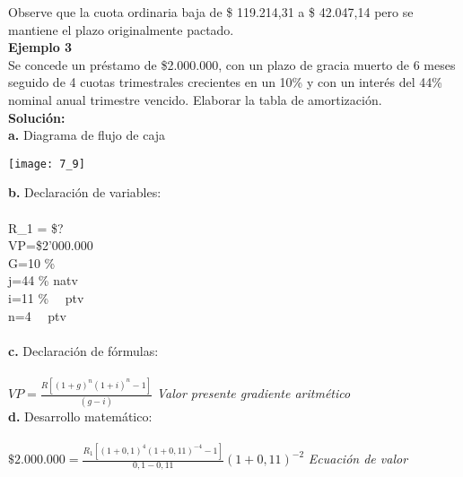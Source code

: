 Observe que la cuota ordinaria baja de \$ 119.214,31 a \$ 42.047,14 pero se mantiene el plazo originalmente pactado.\\

\textbf{Ejemplo 3 }\\
Se concede un préstamo de \$2.000.000, con un plazo de gracia muerto de 6 meses seguido de 4 cuotas trimestrales crecientes en un 10\%  y con un interés del 44\% nominal anual trimestre vencido. Elaborar la tabla de amortización.\\

\textbf{Solución:}\\
\textbf{a.} Diagrama de flujo de caja
\begin{center}
	\texttt{[image: 7\_9]}
\end{center}
\textbf{b.} Declaración de variables: \\\\

	R_{1}  = \$?\\
	VP=\$2'000.000\\
	G=10 \%  \\
	j=44 \% natv \\
	i=11 \% \ \ ptv\\
	n=4 \ \ ptv\\\\

\textbf{c.} Declaración de fórmulas:\\\\

	$VP=\frac{R[(1+g)^{n}(1+i)^{n}-1]}{(g-i)}$ \hspace{35 pt} \textit{Valor presente gradiente aritmético}\\

\textbf{d.} Desarrollo matemático:\\\\

	$\$ 2.000.000=  \frac{R_{1} [(1+0,1)^{4} (1+0,11)^{-4}-1]}{0,1-0,11}(1+0,11)^{-2}$ \hspace{35 pt} \textit{Ecuación de valor}\\

